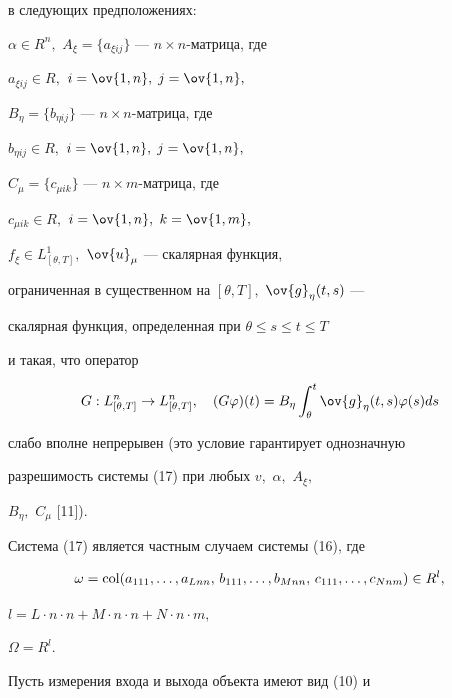в следующих предположениях:


$\alpha\in R^n,$ $A_{\xi}=\{a_{\xi i j}\}$ --- $n\times n$-матрица, где


$a_{\xi ij}\in R,$ $i=\ov{1,n},$ $j=\ov{1,n},$


$B_{\eta}=\{b_{\eta i j}\}$ --- $n\times n$-матрица, где


$b_{\eta ij}\in R,$ $i=\ov{1,n},$ $j=\ov{1,n},$


$C_{\mu}=\{c_{\mu i k}\}$ --- $n\times m$-матрица, где


$c_{\mu i k}\in R,$ $i=\ov{1,n},$ $k=\ov{1,m},$


$f_{\xi}\in L_{[\theta,T]}^1,$ $\ov{u}_{\mu}$ --- скалярная функция,


ограниченная в существенном на $[\theta,T],$ $\ov{g}_{\eta}(t,s)$ ---


скалярная функция, определенная при $\theta\le s\leq t\le T$


и такая, что оператор


$$


G: L_{[\theta,T]}^n \to L_{[\theta,T]}^n,\quad


(G\varphi)(t) =


B_{\eta}\int_{\theta}^t \ov{g}_{\eta}(t,s) \varphi(s)ds


$$


слабо вполне непрерывен (это условие гарантирует однозначную


разрешимость системы (17) при любых $v,$ $\alpha,$ $A_{\xi},$


$B_{\eta},$ $C_{\mu}$ [11]).





Система (17) является частным случаем системы (16), где


$$


\omega=\col (a_{111}, \dotsc, a_{Lnn},\, b_{111}, \dotsc, b_{Mnn},\, c_{111},


\dotsc, c_{Nnm})\in R^l,


$$


$l=L\cdot n\cdot n + M\cdot n\cdot n+ N\cdot n\cdot m,$


$\Omega = R^l.$





Пусть измерения входа и выхода объекта имеют вид (10) и



